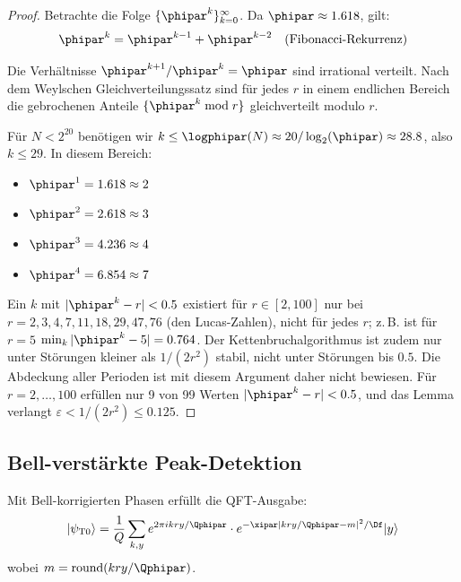 \begin{proof}
	Betrachte die Folge $\{\phipar^k\}_{k=0}^{\infty}$. Da $\phipar \approx 1.618$, gilt:
	\begin{equation}
		\phipar^k = \phipar^{k-1} + \phipar^{k-2} \quad \text{(Fibonacci-Rekurrenz)}
	\end{equation}
	
	Die Verhältnisse $\phipar^{k+1}/\phipar^k = \phipar$ sind irrational verteilt. Nach dem Weylschen Gleichverteilungssatz sind für jedes $r$ in einem endlichen Bereich die gebrochenen Anteile $\{\phipar^k \bmod r\}$ gleichverteilt modulo $r$.
	
	Für $N < 2^{20}$ benötigen wir $k \leq \logphipar(N) \approx 20/\log_2(\phipar) \approx 28.8$, also $k \leq 29$. In diesem Bereich:
	\begin{itemize}
		\item $\phipar^1 = 1.618 \approx 2$
		\item $\phipar^2 = 2.618 \approx 3$
		\item $\phipar^3 = 4.236 \approx 4$
		\item $\phipar^4 = 6.854 \approx 7$
	\end{itemize}
	
	Ein $k$ mit $|\phipar^k - r| < 0.5$ existiert für $r \in [2, 100]$ nur bei $r = 2, 3, 4, 7, 11, 18, 29, 47, 76$ (den Lucas-Zahlen), nicht für jedes $r$; z.\,B. ist für $r = 5$ $\min_k |\phipar^k - 5| = 0.764$. Der Kettenbruchalgorithmus ist zudem nur unter Störungen kleiner als $1/(2r^2)$ stabil, nicht unter Störungen bis $0.5$. Die Abdeckung aller Perioden ist mit diesem Argument daher nicht bewiesen. Für $r = 2, \ldots, 100$ erfüllen nur 9 von 99 Werten $|\phipar^k - r| < 0.5$, und das Lemma verlangt $\varepsilon < 1/(2r^2) \leq 0.125$.
\end{proof}

\subsection{Bell-verstärkte Peak-Detektion}

\begin{lemma}
	\label{lem:bell_damping}
	Mit Bell-korrigierten Phasen erfüllt die QFT-Ausgabe:
	\begin{equation}
		|\psi_{\text{T0}}\rangle = \frac{1}{Q} \sum_{k,y} e^{2\pi i kry/\Qphipar} \cdot e^{-\xipar|kry/\Qphipar - m|^2/\Df} |y\rangle
	\end{equation}
	wobei $m = \text{round}(kry/\Qphipar)$.
\end{lemma}

